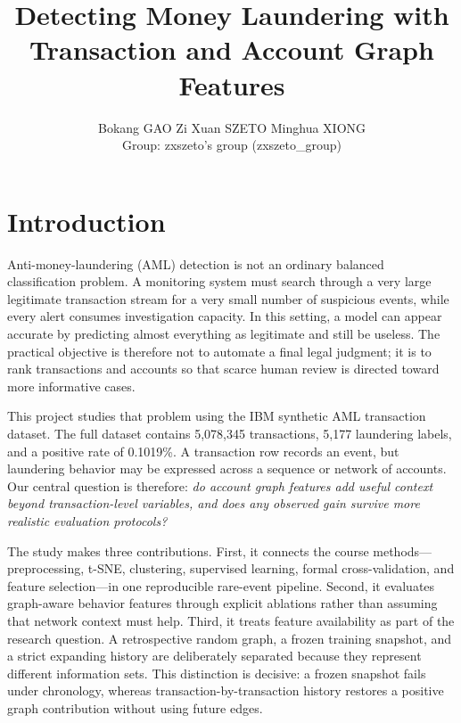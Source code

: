 \documentclass{article}
\title{Detecting Money Laundering with Transaction and Account Graph Features}
\author{Bokang GAO \quad Zi Xuan SZETO \quad Minghua XIONG \\
Group: zxszeto's group (zxszeto\_group)}
\date{}
\begin{document}
\maketitle

\section{Introduction}
Anti-money-laundering (AML) detection is not an ordinary balanced classification problem. A monitoring system must search through a very large legitimate transaction stream for a very small number of suspicious events, while every alert consumes investigation capacity. In this setting, a model can appear accurate by predicting almost everything as legitimate and still be useless. The practical objective is therefore not to automate a final legal judgment; it is to rank transactions and accounts so that scarce human review is directed toward more informative cases.

This project studies that problem using the IBM synthetic AML transaction dataset. The full dataset contains 5,078,345 transactions, 5,177 laundering labels, and a positive rate of 0.1019\%. A transaction row records an event, but laundering behavior may be expressed across a sequence or network of accounts. Our central question is therefore: \emph{do account graph features add useful context beyond transaction-level variables, and does any observed gain survive more realistic evaluation protocols?}

The study makes three contributions. First, it connects the course methods---preprocessing, t-SNE, clustering, supervised learning, formal cross-validation, and feature selection---in one reproducible rare-event pipeline. Second, it evaluates graph-aware behavior features through explicit ablations rather than assuming that network context must help. Third, it treats feature availability as part of the research question. A retrospective random graph, a frozen training snapshot, and a strict expanding history are deliberately separated because they represent different information sets. This distinction is decisive: a frozen snapshot fails under chronology, whereas transaction-by-transaction history restores a positive graph contribution without using future edges.
\end{document}
